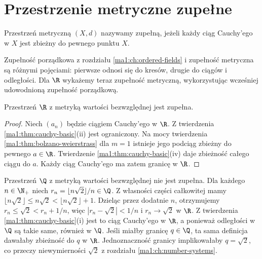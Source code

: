 \section{Przestrzenie metryczne zupełne}
\begin{definicja}
\label{ma1:def:complete-metric}
Przestrzeń metryczną $(X,d)$ nazywamy zupełną, jeżeli każdy ciąg Cauchy'ego w $X$ jest zbieżny do pewnego punktu $X$.
\end{definicja}
Zupełność porządkowa z rozdziału \ref{ma1:ch:ordered-fields} i zupełność metryczna są różnymi pojęciami: pierwsze odnosi się do kresów, drugie do ciągów i odległości. Dla $\R$ wykażemy teraz zupełność metryczną, wykorzystując wcześniej udowodnioną zupełność porządkową.

\begin{twierdzenie}
\label{ma1:thm:real-metric-complete}
Przestrzeń $\R$ z metryką wartości bezwzględnej jest zupełna.
\end{twierdzenie}
\begin{proof}
Niech $(a_n)$ będzie ciągiem Cauchy'ego w $\R$. Z twierdzenia \ref{ma1:thm:cauchy-basic}(ii) jest ograniczony. Na mocy twierdzenia \ref{ma1:thm:bolzano-weierstrass} dla $m=1$ istnieje jego podciąg zbieżny do pewnego $a\in\R$. Twierdzenie \ref{ma1:thm:cauchy-basic}(iv) daje zbieżność całego ciągu do $a$. Każdy ciąg Cauchy'ego ma zatem granicę w $\R$.
\end{proof}
\begin{przyklad}
\label{ma1:ex:rational-incomplete}
Przestrzeń $\Q$ z metryką wartości bezwzględnej nie jest zupełna. Dla każdego $n\in\N_+$ niech $r_n=\lfloor n\sqrt2\rfloor/n\in\Q$. Z własności części całkowitej mamy $\lfloor n\sqrt2\rfloor\le n\sqrt2<\lfloor n\sqrt2\rfloor+1$. Dzieląc przez dodatnie $n$, otrzymujemy $r_n\le\sqrt2<r_n+1/n$, więc $|r_n-\sqrt2|<1/n$ i $r_n\to\sqrt2$ w $\R$. Z twierdzenia \ref{ma1:thm:cauchy-basic}(i) jest to ciąg Cauchy'ego w $\R$, a ponieważ odległości w $\Q$ są takie same, również w $\Q$. Jeśli miałby granicę $q\in\Q$, ta sama definicja dawałaby zbieżność do $q$ w $\R$. Jednoznaczność granicy implikowałaby $q=\sqrt2$, co przeczy niewymierności $\sqrt2$ z rozdziału \ref{ma1:ch:number-systems}. 
\end{przyklad}

